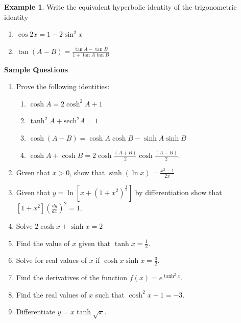 \documentclass[11pt,a4paper]{article}
\theoremstyle{definition}
\newtheorem{example}[thm]{Example}
\begin{document}
\begin{example}

Write the equivalent hyperbolic identity of the trigonometric identity
\begin{enumerate}
\item $\cos 2x=1-2\sin^2x$

\item $\tan (A-B)=\frac{\tan A-\tan B}{1+\tan A\tan B}$\\
\end{enumerate}
\end{example}
\pagebreak
\textbf{Sample Questions}
\begin{enumerate}
\item Prove the following identities:
\begin{enumerate}
      \item $\cosh A=2\cosh^2A+1$\\
      
      \item $\tanh^2A+\text{sech}^2A=1$\\
      
      \item $\cosh (A-B)=\cosh A \cosh B-\sinh A \sinh B$\\
      
      \item $\cosh A+\cosh B =2\cosh \frac{(A+B)}{2}\cosh \frac{(A-B)}{2}$.\\
\end{enumerate}

\item Given that $x>0$, show that $\sinh (\ln x)=\frac{x^2-1}{2x}$\\

\item Given that $y=\ln \left[x+(1+x^2)^{\displaystyle {\frac{1}{2}}}\right]$ by differentiation show that $[1+x^2]\left(\frac{dy}{dx}\right)^2=1$.\\

\item Solve $2\cosh x +\sinh x=2$\\

\item Find the value of $x$ given that $\tanh x=\frac{1}{2}$.\\

\item Solve for real values of $x$ if $\cosh x\sinh x=\frac{3}{2}$.\\

\item Find the derivatives of the function $f(x)=e^{\displaystyle {\tanh^2x}}$.\\

\item Find the real values of $x$ such that $\cosh^2x-1=-3$.\\

\item Differentiate $y=x\tanh \sqrt{x}$.\\
\end{enumerate}
\end{document}
